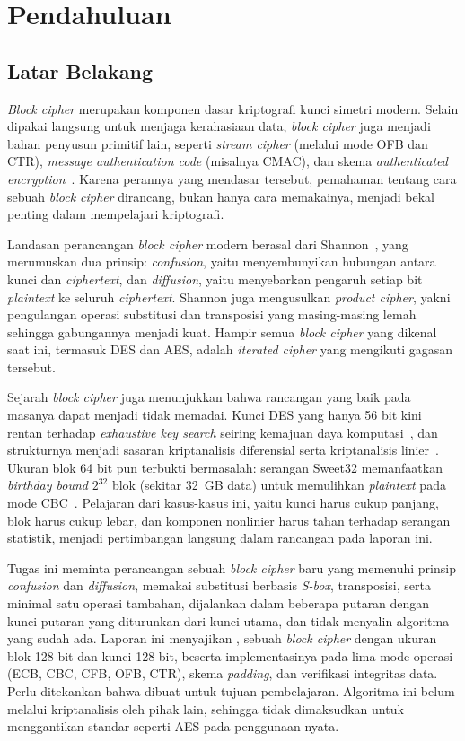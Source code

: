 \section{Pendahuluan}

\subsection{Latar Belakang}
\textit{Block cipher} merupakan komponen dasar kriptografi kunci simetri modern. Selain dipakai langsung
untuk menjaga kerahasiaan data, \textit{block cipher} juga menjadi bahan penyusun primitif lain, seperti
\textit{stream cipher} (melalui mode OFB dan CTR), \textit{message authentication code} (misalnya CMAC),
dan skema \textit{authenticated encryption}~\cite{rinaldi}. Karena perannya yang
mendasar tersebut, pemahaman tentang cara sebuah \textit{block cipher} dirancang, bukan hanya cara
memakainya, menjadi bekal penting dalam mempelajari kriptografi.

Landasan perancangan \textit{block cipher} modern berasal dari Shannon~\cite{rinaldi}, yang merumuskan
dua prinsip: \textit{confusion}, yaitu menyembunyikan hubungan antara kunci dan \textit{ciphertext}, dan
\textit{diffusion}, yaitu menyebarkan pengaruh setiap bit \textit{plaintext} ke seluruh
\textit{ciphertext}. Shannon juga mengusulkan \textit{product cipher}, yakni pengulangan operasi
substitusi dan transposisi yang masing-masing lemah sehingga gabungannya menjadi kuat. Hampir semua
\textit{block cipher} yang dikenal saat ini, termasuk DES dan AES, adalah \textit{iterated cipher} yang
mengikuti gagasan tersebut.

Sejarah \textit{block cipher} juga menunjukkan bahwa rancangan yang baik pada masanya dapat menjadi
tidak memadai. Kunci DES yang hanya 56 bit kini rentan terhadap \textit{exhaustive key search}
seiring kemajuan daya komputasi~\cite{rinaldi}, dan strukturnya menjadi sasaran
kriptanalisis diferensial serta kriptanalisis linier~\cite{rinaldi}. Ukuran blok 64 bit
pun terbukti bermasalah: serangan Sweet32 memanfaatkan \textit{birthday bound} $2^{32}$ blok (sekitar
32~GB data) untuk memulihkan \textit{plaintext} pada mode CBC~\cite{sweet32}. Pelajaran dari
kasus-kasus ini, yaitu kunci harus cukup panjang, blok harus cukup lebar, dan komponen nonlinier harus
tahan terhadap serangan statistik, menjadi pertimbangan langsung dalam rancangan pada laporan ini.

Tugas ini meminta perancangan sebuah \textit{block cipher} baru yang memenuhi prinsip
\textit{confusion} dan \textit{diffusion}, memakai substitusi berbasis \textit{S-box}, transposisi, serta
minimal satu operasi tambahan, dijalankan dalam beberapa putaran dengan kunci putaran yang diturunkan
dari kunci utama, dan tidak menyalin algoritma yang sudah ada. Laporan ini menyajikan \algname{},
sebuah \textit{block cipher} dengan ukuran blok 128 bit dan kunci 128 bit, beserta implementasinya pada
lima mode operasi (ECB, CBC, CFB, OFB, CTR), skema \textit{padding}, dan verifikasi integritas data.
Perlu ditekankan bahwa \algname{} dibuat untuk tujuan pembelajaran. Algoritma ini belum melalui
kriptanalisis oleh pihak lain, sehingga tidak dimaksudkan untuk menggantikan standar seperti AES pada
penggunaan nyata.

